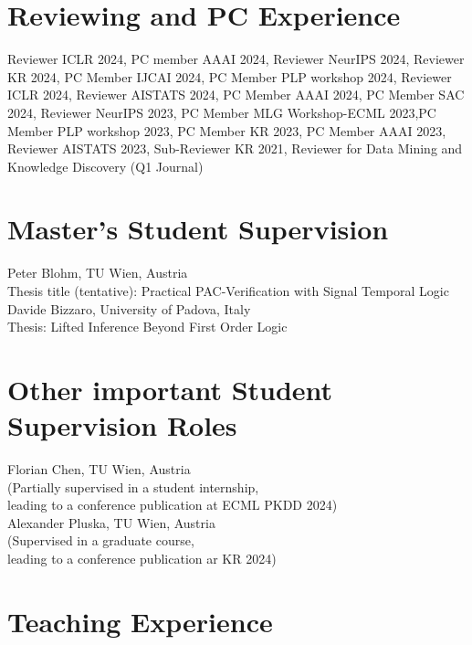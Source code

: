 \documentclass[10pt, a4paper]{article}
\newcommand{\years}[1]{\marginnote{\scriptsize #1}}
\begin{document}



\section*{Reviewing and PC Experience}
Reviewer ICLR 2024, PC member AAAI 2024, Reviewer NeurIPS 2024, Reviewer KR 2024, PC Member IJCAI 2024, PC Member PLP workshop 2024, Reviewer ICLR 2024, Reviewer AISTATS 2024, PC Member AAAI 2024, PC Member SAC 2024, Reviewer NeurIPS 2023, PC Member MLG Workshop-ECML 2023,PC Member PLP workshop 2023, PC Member  KR 2023, PC Member  AAAI 2023, Reviewer  AISTATS 2023, Sub-Reviewer  KR 2021, Reviewer for  Data Mining and Knowledge Discovery (Q1 Journal)


\section*{Master's Student Supervision}
\years{2024} Peter Blohm,  TU Wien, Austria\\
Thesis title (tentative): Practical PAC-Verification with Signal Temporal Logic \\ 

\years{2023} Davide Bizzaro,  University of Padova, Italy\\
Thesis: Lifted Inference Beyond First Order Logic 

\section*{Other important Student Supervision Roles}
    \years{2024} Florian Chen, TU Wien, Austria\\
    (Partially supervised in a student internship,\\ leading to a conference publication at ECML PKDD 2024)\\

    \years{2024} Alexander Pluska,  TU Wien, Austria\\ 
    (Supervised in a graduate course,\\ leading to a conference publication ar KR 2024)\\

\section*{Teaching Experience}
\end{document}

